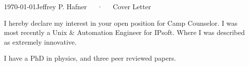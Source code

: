 \documentclass[11pt, a4paper]{awesome-cv}
\begin{document}
\makecvheader[R]

\makecvfooter
  {\today}{Jeffrey P. Hafner~~~·~~~Cover Letter}{}

\makelettertitle

\begin{cvletter}

I hereby declare my interest in your open position for Camp Counselor.
I was most recently a Unix \& Automation Engineer for IPsoft.
Where I was described as extremely innovative.

I have a PhD in physics, and three peer reviewed papers.






%

\end{cvletter}


\makeletterclosing
\end{document}
